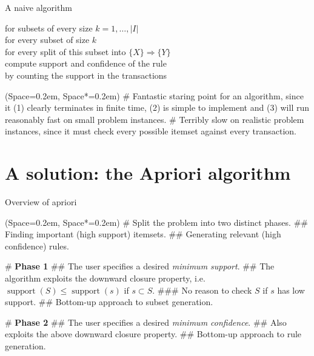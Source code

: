 \documentclass[12pt, aspectratio=1610]{beamer}
\newcommand{\listSpace}{0.2em}
\theoremstyle{plain}
\begin{document}
\begin{frame}[fragile]{A naive algorithm}
	
	\begin{example}
		for subsets of every size $k=1, \dots, |I|$ \\
		\hspace*{1em} for every subset of size $k$ \\
		\hspace*{2em} for every split of this subset into $\{ X \} \Rightarrow \{ Y \}$ \\
		\hspace*{3em} compute support and confidence of the rule \\
		\hspace*{3em} by counting the support in the transactions
	\end{example}
	
	\begin{easylist}[itemize]
		\ListProperties(Space=\listSpace, Space*=\listSpace)
		# Fantastic staring point for an algorithm, since it (1) clearly terminates in finite time, (2) is simple to implement and (3) will run reasonably fast on small problem instances.
		# Terribly slow on realistic problem instances, since it must check every possible itemset against every transaction.
	\end{easylist}
\end{frame}
\section{A solution: the Apriori algorithm}
\begin{frame}[fragile]{Overview of apriori}
	
	\begin{easylist}[itemize]
		\ListProperties(Space=\listSpace, Space*=\listSpace)
		# Split the problem into two distinct phases.
		## Finding important (high support) itemsets.
		## Generating relevant (high confidence) rules.
		
		# \textbf{Phase 1}
		## The user specifies a desired \emph{minimum support}.
		## The algorithm exploits the downward closure property, i.e. $\operatorname{support}(S) \leq \operatorname{support}(s)$ if $s \subset S$.
		### No reason to check $S$ if $s$ has low support.
		## Bottom-up approach to subset generation.
		
		# \textbf{Phase 2}
		## The user specifies a desired \emph{minimum confidence}.
		## Also exploits the above downward closure property.
		## Bottom-up approach to rule generation.
	\end{easylist}
\end{frame}
\end{document}
